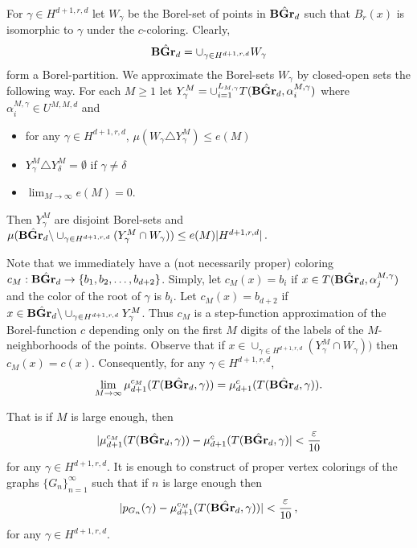 \documentclass{article}
\newcommand{\ep}{\varepsilon}
\newcommand{\e}{\ep}
\newcommand{\BGrd}[1][d]{\textrm{\textbf{BGr}}_{#1}}
\newcommand{\hb}{\hat{\BGrd}}
\begin{document}
\noindent
For $\gamma\in H^{d+1,r,d}$ let $W_\gamma$ be the Borel-set of points
in $\hb$ such that $B_r(x)$ is isomorphic to $\gamma$ under the $c$-coloring.
Clearly,
$$\hb=\cup_{\gamma\in H^{d+1,r,d}}W_\gamma$$
form a Borel-partition.
We approximate the Borel-sets $W_\gamma$ by closed-open sets the following
way.
For each $M\geq 1$ let $Y^M_\gamma=\cup^{L_{M,\gamma}}_{i=1}
  T(\hb,\alpha^{M,\gamma}_i)$ where
$\alpha_i^{M,\gamma}\in U^{M,M,d}$ and
\begin{itemize}
\item for any $\gamma\in H^{d+1,r,d}$,
$\mu(W_\gamma\triangle Y^M_\gamma)\leq e(M)$
\item
$Y^M_\gamma\triangle Y^M_{\delta}=\emptyset$ if $\gamma\neq\delta$
\item $\lim_{M\to\infty} e(M)=0$.
\end{itemize}
Then $Y^M_\gamma$ are disjoint Borel-sets and
$\mu(\hb\backslash \cup_{\gamma\in H^{d+1,r,d}}
 (Y^M_\gamma\cap W_\gamma))\leq e(M) |H^{d+1,r,d}|\,.$

\noindent
Note that we immediately have a
(not necessarily proper) coloring $c_M:\hb\to\{b_1,b_2,\dots,b_{d+2}\}$.
Simply, let $c_M(x)=b_i$ if $x\in T(\hb,\alpha^{M,\gamma}_j)$ and the color of
the root of $\gamma$ is $b_i$. Let $c_M(x)=b_{d+2}$
if $x\in\hb\backslash \cup_{\gamma\in H^{d+1,r,d}}
 Y^M_\gamma$.
Thus $c_M$ is a step-function approximation of the Borel-function $c$
depending only on the first $M$ digits of the labels of the $M$-neighborhoods
of the points. Observe that if $x\in \cup_{\gamma\in H^{d+1,r,d}}
 (Y^M_\gamma\cap W_\gamma))$ then $c_M(x)=c(x)$.
Consequently, for any $\gamma\in H^{d+1,r,d}$,
$$\lim_{M \to\infty} \mu^{c_M}_{d+1}(T(\hb,\gamma))=
\mu^{c}_{d+1}(T(\hb,\gamma)).$$

That is if $M$ is large enough, then
$$|\mu^{c_M}_{d+1}(T(\hb,\gamma))-\mu^{c}_{d+1}(T(\hb,\gamma)|<\frac{\e}{10}$$
for any $\gamma\in H^{d+1,r,d}$. It is enough to construct of proper
vertex colorings of the graphs $\{G_n\}^\infty_{n=1}$ such that
if $n$ is large enough then
$$|p_{G_n}(\gamma)-\mu^{c_M}_{d+1}(T(\hb,\gamma))|<\frac{\e}{10}\,,$$
for any $\gamma\in H^{d+1,r,d}$.
\end{document}
